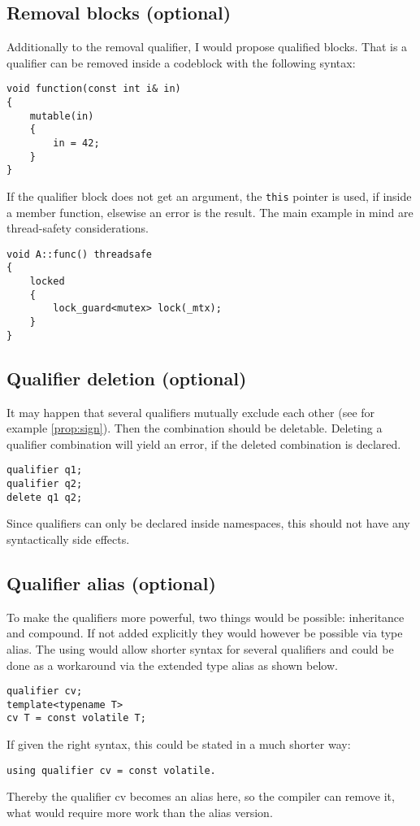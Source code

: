 \subsection{Removal blocks (optional)}
Additionally to the removal qualifier, I would propose qualified blocks. That is a qualifier can be removed inside a codeblock with the following syntax:
\begin{lstlisting}
void function(const int i& in)
{
	mutable(in)
	{
		in = 42;
	}
}
\end{lstlisting}
If the qualifier block does not get an argument, the \lstinline {this} pointer is used, if inside a member function, elsewise an error is the result. The main example in mind are thread-safety considerations. 
\begin{lstlisting}
void A::func() threadsafe
{
	locked
	{
		lock_guard<mutex> lock(_mtx);
	}
}
\end{lstlisting}
\subsection{Qualifier deletion (optional)}\label{prop:del}
It may happen that several qualifiers mutually exclude each other (see for example \ref{prop:sign}). Then the combination should be deletable. Deleting a qualifier combination will yield an error, if the deleted combination is declared.
\begin{lstlisting}
qualifier q1;
qualifier q2;
delete q1 q2;
\end{lstlisting}
Since qualifiers can only be declared inside namespaces, this should not have any syntactically side effects.
\subsection{Qualifier alias (optional)}
To make the qualifiers more powerful, two things would be possible: inheritance and compound. If not added explicitly they would however be possible via type alias. The using would allow shorter syntax for several qualifiers and could be done as a workaround via the extended type alias as shown below.  
\begin{lstlisting}
qualifier cv;
template<typename T>
cv T = const volatile T;
\end{lstlisting}
If given the right syntax, this could be stated in a much shorter way:
\begin{lstlisting}
using qualifier cv = const volatile.
\end{lstlisting}
Thereby the qualifier cv becomes an alias here, so the compiler can remove it, what would require more work than the alias version.
